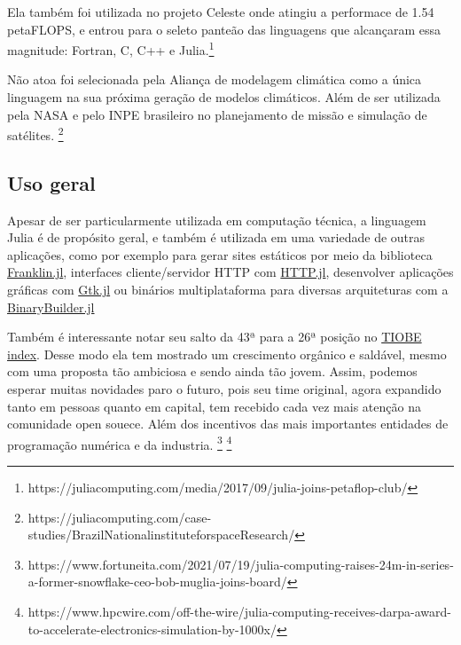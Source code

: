 Ela também foi utilizada no projeto Celeste onde atingiu a performace de 1.54 petaFLOPS, e entrou para o seleto panteão das linguagens que alcançaram essa magnitude: Fortran, C, C++ e Julia.\footnote{https://juliacomputing.com/media/2017/09/julia-joins-petaflop-club/}

Não atoa foi selecionada pela Aliança de modelagem climática como a única linguagem na sua próxima geração de modelos climáticos. Além de ser utilizada pela NASA e pelo INPE brasileiro no planejamento de missão e simulação de satélites. \footnote{https://juliacomputing.com/case-studies/BrazilNationalinstituteforspaceResearch/}



\subsection{Uso geral}

Apesar de ser particularmente utilizada em computação técnica, a linguagem Julia é de propósito geral, e também é utilizada em uma variedade de outras aplicações, como por exemplo para gerar sites estáticos por meio da biblioteca \href{http://franklinjl.org/)}{Franklin.jl}, interfaces cliente/servidor HTTP com \href{https://github.com/JuliaWeb/HTTP.jl}{HTTP.jl}, desenvolver aplicações gráficas com \href{https://github.com/JuliaGraphics/Gtk.jl}{Gtk.jl} ou binários multiplataforma para diversas arquiteturas com a \href{http://binarybuilder.org/}{BinaryBuilder.jl}

Também é interessante notar seu salto da 43ª para a 26ª posição no \href{https://www.tiobe.com/tiobe-index/}{TIOBE index}. 
Desse modo ela tem mostrado um crescimento orgânico e saldável, mesmo com uma proposta tão ambiciosa e sendo ainda tão jovem. Assim, podemos esperar muitas novidades paro o futuro, pois seu time original, agora expandido tanto em pessoas quanto em capital, tem recebido cada vez mais atenção na comunidade open souece. Além dos incentivos das mais importantes entidades de programação numérica e da industria. \footnote{https://www.fortuneita.com/2021/07/19/julia-computing-raises-24m-in-series-a-former-snowflake-ceo-bob-muglia-joins-board/} \footnote{https://www.hpcwire.com/off-the-wire/julia-computing-receives-darpa-award-to-accelerate-electronics-simulation-by-1000x/}





